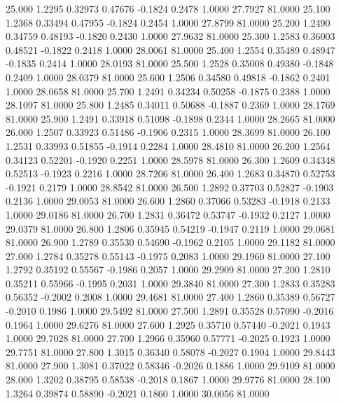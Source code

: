   25.000   1.2295   0.32973   0.47676  -0.1824   0.2478   1.0000  27.7927  81.0000
  25.100   1.2368   0.33494   0.47955  -0.1824   0.2454   1.0000  27.8799  81.0000
  25.200   1.2490   0.34759   0.48193  -0.1820   0.2430   1.0000  27.9632  81.0000
  25.300   1.2583   0.36003   0.48521  -0.1822   0.2418   1.0000  28.0061  81.0000
  25.400   1.2554   0.35489   0.48947  -0.1835   0.2414   1.0000  28.0193  81.0000
  25.500   1.2528   0.35008   0.49380  -0.1848   0.2409   1.0000  28.0379  81.0000
  25.600   1.2506   0.34580   0.49818  -0.1862   0.2401   1.0000  28.0658  81.0000
  25.700   1.2491   0.34234   0.50258  -0.1875   0.2388   1.0000  28.1097  81.0000
  25.800   1.2485   0.34011   0.50688  -0.1887   0.2369   1.0000  28.1769  81.0000
  25.900   1.2491   0.33918   0.51098  -0.1898   0.2344   1.0000  28.2665  81.0000
  26.000   1.2507   0.33923   0.51486  -0.1906   0.2315   1.0000  28.3699  81.0000
  26.100   1.2531   0.33993   0.51855  -0.1914   0.2284   1.0000  28.4810  81.0000
  26.200   1.2564   0.34123   0.52201  -0.1920   0.2251   1.0000  28.5978  81.0000
  26.300   1.2609   0.34348   0.52513  -0.1923   0.2216   1.0000  28.7206  81.0000
  26.400   1.2683   0.34870   0.52753  -0.1921   0.2179   1.0000  28.8542  81.0000
  26.500   1.2892   0.37703   0.52827  -0.1903   0.2136   1.0000  29.0053  81.0000
  26.600   1.2860   0.37066   0.53283  -0.1918   0.2133   1.0000  29.0186  81.0000
  26.700   1.2831   0.36472   0.53747  -0.1932   0.2127   1.0000  29.0379  81.0000
  26.800   1.2806   0.35945   0.54219  -0.1947   0.2119   1.0000  29.0681  81.0000
  26.900   1.2789   0.35530   0.54690  -0.1962   0.2105   1.0000  29.1182  81.0000
  27.000   1.2784   0.35278   0.55143  -0.1975   0.2083   1.0000  29.1960  81.0000
  27.100   1.2792   0.35192   0.55567  -0.1986   0.2057   1.0000  29.2909  81.0000
  27.200   1.2810   0.35211   0.55966  -0.1995   0.2031   1.0000  29.3840  81.0000
  27.300   1.2833   0.35283   0.56352  -0.2002   0.2008   1.0000  29.4681  81.0000
  27.400   1.2860   0.35389   0.56727  -0.2010   0.1986   1.0000  29.5492  81.0000
  27.500   1.2891   0.35528   0.57090  -0.2016   0.1964   1.0000  29.6276  81.0000
  27.600   1.2925   0.35710   0.57440  -0.2021   0.1943   1.0000  29.7028  81.0000
  27.700   1.2966   0.35960   0.57771  -0.2025   0.1923   1.0000  29.7751  81.0000
  27.800   1.3015   0.36340   0.58078  -0.2027   0.1904   1.0000  29.8443  81.0000
  27.900   1.3081   0.37022   0.58346  -0.2026   0.1886   1.0000  29.9109  81.0000
  28.000   1.3202   0.38795   0.58538  -0.2018   0.1867   1.0000  29.9776  81.0000
  28.100   1.3264   0.39874   0.58890  -0.2021   0.1860   1.0000  30.0056  81.0000
